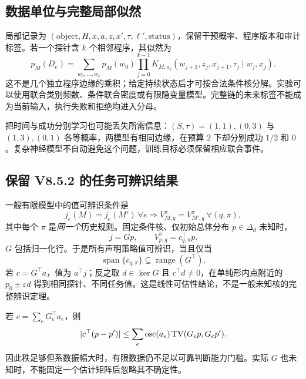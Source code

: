 \documentclass[11pt,a4paper,fontset=fandol]{ctexart}
\theoremstyle{definition}
\theoremstyle{remark}\newtheorem{remark}[theorem]{说明}
\numberwithin{equation}{section}
\newcommand{\TV}{\operatorname{TV}}\newcommand{\supp}{\operatorname{supp}}
\begin{document}
\subsection{数据单位与完整局部似然}
局部记录为 $(\mathrm{object},H,x,a,z,x',\tau,\ell',\mathrm{status})$，保留干预概率、程序版本和审计标签。若一个探针含 $k$ 个相邻程序，其似然为
\begin{equation}
 p_M(D_e)=\sum_{w_0,\ldots,w_k}p_M(w_0)
 \prod_{j=0}^{k-1}K_{M,a_j}(w_{j+1},z_j,x_{j+1},\tau_j\mid w_j,x_j).
 \label{eq:likelihood}
\end{equation}
这不是几个独立程序边缘的乘积；给定持续状态后才可按合法条件核分解。实验可以使用联合类别频数、条件联合密度或有限隐变量模型。完整链的未来标签不能成为当前输入，执行失败和拒绝均进入分母。

把时间与成功分别学习也可能丢失所需信息：$(S,\tau)=(1,1),(0,3)$ 与 $(1,3),(0,1)$ 各等概率，两模型有相同边缘，在预算 $2$ 下却分别成功 $1/2$ 和 $0$。复杂神经模型不自动避免这个问题，训练目标必须保留相应联合事件。

\subsection{保留 V8.5.2 的任务可辨识结果}
一般有限模型中的值可辨识条件是
\begin{equation}
 j_e(M)=j_e(M')\ \forall e
 \Longrightarrow
 V_{M,q}^{\pi}=V_{M',q}^{\pi}\ \forall(q,\pi),
 \label{eq:ident_general}
\end{equation}
其中每个 $\pi$ 是\emph{同一个}历史规则。固定条件核、仅初始总体分布 $p\in\Delta_d$ 未知时，
\begin{equation}
 j=Gp,\qquad V_{p,q}^{\pi}=c_{q,\pi}^{\top}p.
\end{equation}
$G$ 包括归一化行。于是所有声明策略值可辨识，当且仅当
\begin{equation}
 \operatorname{span}\{c_{q,\pi}\}\subseteq\operatorname{range}(G^\top).
 \label{eq:rank}
\end{equation}
若 $c=G^\top a$，值为 $a^\top j$；反之取 $d\in\ker G$ 且 $c^\top d\ne0$，在单纯形内点附近的 $p_0\pm\varepsilon d$ 得到相同探针、不同任务值。这是线性可估性结论，不是一般未知核的完整辨识定理。

若 $c=\sum_eG_e^\top a_e$，则
\begin{equation}
 |c^\top(p-p')|\le\sum_e\osc(a_e)\TV(G_ep,G_ep').
 \label{eq:stability}
\end{equation}
因此秩足够但系数振幅大时，有限数据仍不足以可靠判断能力门槛。实际 $G$ 也未知时，不能固定一个估计矩阵后忽略其不确定性。
\end{document}
